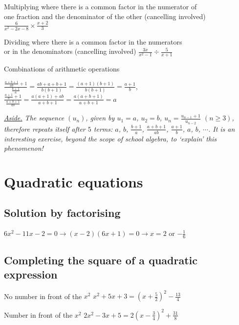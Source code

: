 \documentclass{article}
\begin{document}
Multiplying where there is a common factor in the numerator of \\ one fraction and the denominator of the other (cancelling involved) \hfill
\(\frac{6}{x^2 - 2x - 8} \times \frac{x+2}{3}\)

Dividing where there is a common factor in the numerators \\ or in the denominators (cancelling involved) \hfill
\(\frac{3x}{x^2 - 1} \div \frac{5}{x+1}\)

Combinations of arithmetic operations
\vspace{-1.2cm}
\begin{flushright}
\(\frac{\frac{a+b+1}{ab} + 1}{\frac{b+1}{a}} = \frac{ab + a + b + 1}{b(b+1)} = \frac{(a+1)(b+1)}{b(b+1)} = \frac{a+1}{b}\), \\
\(\frac{\frac{a+1}{b} + 1}{\frac{a+b+1}{ab}} = \frac{a(a+1) + ab}{a+b + 1} = \frac{a(a+b + 1)}{a+b+1} = a\)
\end{flushright}

\textit{\underline{Aside.} The sequence \((u_n)\), given by \(u_1 = a\), \(u_2 = b\), \(u_n = \frac{u_{n-1} + 1}{u_{n-2}}\) \((n \geq 3)\), therefore repeats itself after \(5\) terms:  \(a\), \(b\), \(\frac{b+1}{a}\), \(\frac{a+b+1}{ab}\), \(\frac{a+1}{b}\), \(a\), \(b\), \(\cdots\).  It is an interesting exercise, beyond the scope of school algebra, to \lq explain' this phenomenon!}

\section{Quadratic equations}

\subsection{Solution by factorising}
\begin{flushright}
\(6x^2 - 11x - 2 = 0 \rightarrow (x-2)(6x+1) = 0 \rightarrow x = 2\) or \(-\frac{1}{6}\)
\end{flushright}

\subsection{Completing the square of a quadratic expression}

No number in front of the \(x^2\) \hfill \(x^2 + 5x + 3 = \left(  x + \frac{5}{2} \right)  ^2 - \frac{13}{4}\)

Number in front of the \(x^2\) \hfill \(2x^2 - 3x + 5 = 2 \left(  x - \frac{3}{4} \right)  ^2 + \frac{31}{8}\)
\end{document}
